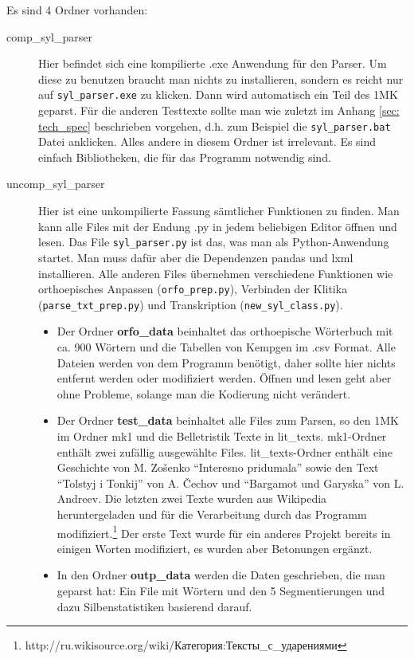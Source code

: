 \documentclass[12pt,headsepline,a4paper]{scrartcl}
\newcommand\textcyr[1]{{\fontencoding{OT2}\fontfamily{wncyr}\selectfont #1}}
\begin{document}
Es sind 4 Ordner vorhanden:
\begin{description}
\item[comp\_syl\_parser] Hier befindet sich eine kompilierte .exe Anwendung für den Parser. Um diese zu benutzen braucht man nichts zu installieren, sondern es reicht nur auf \texttt{syl\_parser.exe} zu klicken. Dann wird automatisch ein Teil des 1MK geparst. Für die anderen Testtexte sollte man wie zuletzt im Anhang \ref{sec: tech_spec} beschrieben vorgehen, d.h. zum Beispiel die \texttt{syl\_parser.bat} Datei anklicken. Alles andere in diesem Ordner ist irrelevant. Es sind einfach Bibliotheken, die für das Programm notwendig sind. 
\item[uncomp\_syl\_parser] Hier ist eine unkompilierte Fassung sämtlicher Funktionen zu finden. Man kann alle Files mit der Endung .py in jedem beliebigen Editor öffnen und lesen. Das File \texttt{syl\_parser.py} ist das, was man als Python-Anwendung startet. Man muss dafür aber die Dependenzen pandas und lxml installieren. Alle anderen Files übernehmen verschiedene Funktionen wie orthoepisches Anpassen (\texttt{orfo\_prep.py}), Verbinden der Klitika (\texttt{parse\_txt\_prep.py}) und Transkription (\texttt{new\_syl\_class.py}).
\begin{itemize}
  \item Der Ordner \textbf{orfo\_data} beinhaltet das orthoepische Wörterbuch mit ca. 900 Wörtern und die Tabellen von Kempgen im .csv Format. Alle Dateien werden von dem Programm benötigt, daher sollte hier nichts entfernt werden oder modifiziert werden. Öffnen und lesen geht aber ohne Probleme, solange man die Kodierung nicht verändert.
  \item Der Ordner \textbf{test\_data} beinhaltet alle Files zum Parsen, so den 1MK im Ordner mk1 und die Belletristik Texte in lit\_texts. mk1-Ordner enthält zwei zufällig ausgewählte Files. lit\_texts-Ordner enthält eine Geschichte von M. Zošenko "`Interesno pridumala"' sowie den Text "`Tolstyj i Tonkij"' von A. Čechov und "`Bargamot und Garyska"' von L. Andreev. Die letzten zwei Texte wurden aus Wikipedia heruntergeladen und für die Verarbeitung durch das Programm modifiziert.\footnote{http://ru.wikisource.org/wiki/\textcyr{Категория:Тексты\_с\_ударениями}} Der erste Text wurde für ein anderes Projekt bereits in einigen Worten modifiziert, es wurden aber Betonungen ergänzt.
  \item In den Ordner \textbf{outp\_data} werden die Daten geschrieben, die man geparst hat: Ein File mit Wörtern und den 5 Segmentierungen und dazu Silbenstatistiken basierend darauf.
 

\end{itemize}
\end{description}
\end{document}
